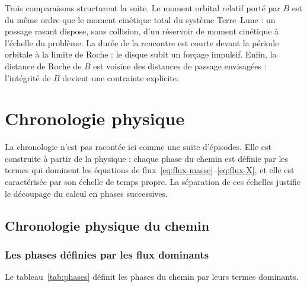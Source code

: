 \documentclass[11pt,a4paper,openany]{report}
\begin{document}
\begin{controle}
Trois comparaisons structurent la suite. Le moment orbital relatif porté par $B$ est du même
ordre que le moment cinétique total du système Terre--Lune : un passage rasant dispose, sans
collision, d'un réservoir de moment cinétique à l'échelle du problème. La durée de la rencontre
est courte devant la période orbitale à la limite de Roche : le disque subit un forçage
impulsif. Enfin, la distance de Roche de $B$ est voisine des distances de passage envisagées :
l'intégrité de $B$ devient une contrainte explicite.
\end{controle}


\part{Chronologie physique}
\label{part:chronologie}

\noindent
La chronologie n'est pas racontée ici comme une suite d'épisodes. Elle est construite à partir de
la physique : chaque phase du chemin est définie par les termes qui dominent les équations de
flux~\eqref{eq:flux-masse}--\eqref{eq:flux-X}, et elle est caractérisée par son échelle de temps
propre. La séparation de ces échelles justifie le découpage du calcul en phases successives.

\chapter{Chronologie physique du chemin}
\label{ch:chronologie}

\section{Les phases définies par les flux dominants}

Le tableau~\ref{tab:phases} définit les phases du chemin par leurs termes dominants.
\end{document}
